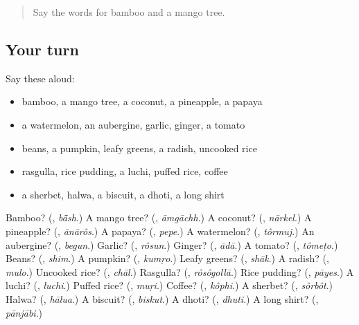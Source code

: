 \label{lesson:BN-R119-second-pass-nature-and-food}



\begin{quote}
Say the words for bamboo and a mango tree.
\end{quote}

\subsection*{Your turn}
Say these aloud:

\begin{itemize}
\raggedright
  \item bamboo, a mango tree, a coconut, a pineapple, a papaya
  \item a watermelon, an aubergine, garlic, ginger, a tomato
  \item beans, a pumpkin, leafy greens, a radish, uncooked rice
  \item rasgulla, rice pudding, a luchi, puffed rice, coffee
  \item a sherbet, halwa, a biscuit, a dhoti, a long shirt
\end{itemize}

\begin{tcolorbox}[breakable,colback=teal!4,colframe=teal!35!black,title={Before you move on}]
Bamboo? (\textbf{}, \emph{bā̃sh}.) A mango tree? (\textbf{}, \emph{āmgāchh}.) A coconut? (\textbf{}, \emph{nārkel}.) A pineapple? (\textbf{}, \emph{ānārôs}.) A papaya? (\textbf{}, \emph{pepe}.) A watermelon? (\textbf{}, \emph{tôrmuj}.) An aubergine? (\textbf{}, \emph{begun}.) Garlic? (\textbf{}, \emph{rôsun}.) Ginger? (\textbf{}, \emph{ādā}.) A tomato? (\textbf{}, \emph{tômeṭo}.) Beans? (\textbf{}, \emph{shim}.) A pumpkin? (\textbf{}, \emph{kumṛo}.) Leafy greens? (\textbf{}, \emph{shāk}.) A radish? (\textbf{}, \emph{mulo}.) Uncooked rice? (\textbf{}, \emph{chāl}.) Rasgulla? (\textbf{}, \emph{rôsôgollā}.) Rice pudding? (\textbf{}, \emph{pāyes}.) A luchi? (\textbf{}, \emph{luchi}.) Puffed rice? (\textbf{}, \emph{muṛi}.) Coffee? (\textbf{}, \emph{kôphi}.) A sherbet? (\textbf{}, \emph{sôrbôt}.) Halwa? (\textbf{}, \emph{hālua}.) A biscuit? (\textbf{}, \emph{biskut}.) A dhoti? (\textbf{}, \emph{dhuti}.) A long shirt? (\textbf{}, \emph{pānjābi}.)
\end{tcolorbox}
